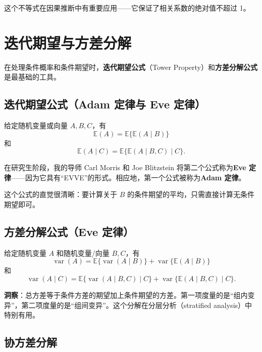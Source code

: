 这个不等式在因果推断中有重要应用——它保证了相关系数的绝对值不超过 1。

\section{迭代期望与方差分解}\label{sec:tower-property}

在处理条件概率和条件期望时，\textbf{迭代期望公式}（Tower Property）和\textbf{方差分解公式}是最基础的工具。

\subsection{迭代期望公式（Adam 定律与 Eve 定律）}

\begin{Proposition}[迭代期望公式]\label{prop:iterated-expectation}
给定随机变量或向量 $A, B, C$，有
\[
\mathbb{E}(A) = \mathbb{E}\{\mathbb{E}(A \mid B)\}
\]
和
\[
\mathbb{E}(A \mid C) = \mathbb{E}\{\mathbb{E}(A \mid B, C) \mid C\}.
\]
\end{Proposition}

在研究生阶段，我的导师 Carl Morris 和 Joe Blitzstein 将第二个公式称为\textbf{Eve 定律}——因为它具有``EVVE''的形式。相应地，第一个公式被称为\textbf{Adam 定律}。

这个公式的直觉很清晰：要计算关于 $B$ 的条件期望的平均，只需直接计算无条件期望即可。

\subsection{方差分解公式（Eve 定律）}

\begin{Proposition}[方差分解]\label{prop:variance-decomposition}
给定随机变量 $A$ 和随机变量/向量 $B, C$，有
\[
\operatorname{var}(A) = \mathbb{E}\{\operatorname{var}(A \mid B)\} + \operatorname{var}\{\mathbb{E}(A \mid B)\}
\]
和
\[
\operatorname{var}(A \mid C) = \mathbb{E}\{\operatorname{var}(A \mid B, C) \mid C\} + \operatorname{var}\{\mathbb{E}(A \mid B, C) \mid C\}.
\]
\end{Proposition}

\textbf{洞察}：总方差等于条件方差的期望加上条件期望的方差。第一项度量的是``组内变异''，第二项度量的是``组间变异''。这个分解在分层分析（stratified analysis）中特别有用。

\subsection{协方差分解}

